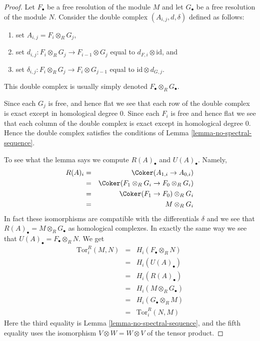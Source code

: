 \begin{proof}
Let $F_\bullet$ be a free resolution of the module $M$ and
let $G_\bullet$ be a free resolution of the module $N$.
Consider the double complex $(A_{i, j}, d, \delta)$ defined
as follows:
\begin{enumerate}
\item set $A_{i, j} = F_i \otimes_R G_j$,
\item set $d_{i, j} : F_i \otimes_R G_j \to F_{i-1} \otimes G_j$
equal to $d_{F, i} \otimes \text{id}$, and
\item set $\delta_{i, j} : F_i \otimes_R G_j \to F_i \otimes G_{j-1}$
equal to $\text{id} \otimes d_{G, j}$.
\end{enumerate}
This double complex is usually simply denoted $F_\bullet \otimes_R G_\bullet$.

\medskip\noindent
Since each $G_j$ is free, and hence flat we see that each
row of the double complex is exact except in homological
degree $0$. Since each $F_i$ is free and hence flat we see that each
column of the double complex is exact except in homological
degree $0$. Hence the double complex satisfies the conditions
of Lemma \ref{lemma-no-spectral-sequence}.

\medskip\noindent
To see what the lemma says we compute $R(A)_\bullet$ and $U(A)_\bullet$.
Namely,
\begin{eqnarray*}
R(A)_i & = & \Coker(A_{1, i} \to A_{0, i}) \\
& = & \Coker(F_1 \otimes_R G_i \to F_0 \otimes_R G_i) \\
& = & \Coker(F_1 \to F_0) \otimes_R G_i \\
& = & M \otimes_R G_i
\end{eqnarray*}
In fact these isomorphisms are compatible with the differentials
$\delta$ and we see that $R(A)_\bullet = M \otimes_R G_\bullet$
as homological complexes. In exactly the same way we see that
$U(A)_\bullet = F_\bullet \otimes_R N$. We get
\begin{eqnarray*}
\text{Tor}_i^R(M, N)
& = & H_i(F_\bullet \otimes_R N) \\
& = & H_i(U(A)_\bullet) \\
& = & H_i(R(A)_\bullet) \\
& = & H_i(M \otimes_R G_\bullet) \\
& = & H_i(G_\bullet \otimes_R M) \\
& = & \text{Tor}_i^R(N, M)
\end{eqnarray*}
Here the third equality is Lemma \ref{lemma-no-spectral-sequence}, and
the fifth equality uses the isomorphism $V \otimes W = W \otimes V$
of the tensor product.


\end{proof}
